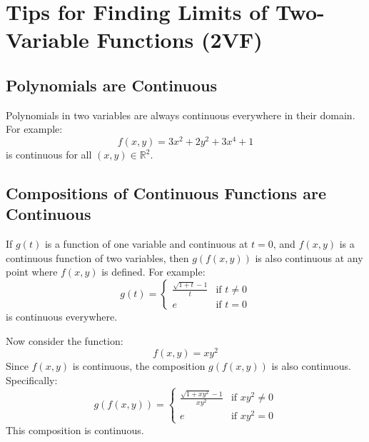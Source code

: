 \documentclass{report}
\begin{document}

\section{Tips for Finding Limits of Two-Variable Functions (2VF)}

\subsection{Polynomials are Continuous}
Polynomials in two variables are always continuous everywhere in their domain. For example:
\[
	f(x, y) = 3x^2 + 2y^2 + 3x^4 + 1
\]
is continuous for all $(x, y) \in \mathbb{R}^2$.

\subsection{Compositions of Continuous Functions are Continuous}
If $g(t)$ is a function of one variable and continuous at $t = 0$, and $f(x, y)$ is a continuous function of two variables, then $g(f(x, y))$ is also continuous at any point where $f(x, y)$ is defined. For example:
\[
	g(t) =
	\begin{cases}
		\frac{\sqrt{1 + t} - 1}{t} & \text{if } t \neq 0 \\
		e                          & \text{if } t = 0
	\end{cases}
\]
is continuous everywhere.

Now consider the function:
\[
	f(x, y) = x y^2
\]
Since $f(x, y)$ is continuous, the composition $g(f(x, y))$ is also continuous. Specifically:
\[
	g(f(x, y)) =
	\begin{cases}
		\frac{\sqrt{1 + x y^2} - 1}{x y^2} & \text{if } x y^2 \neq 0 \\
		e                                  & \text{if } x y^2 = 0
	\end{cases}
\]
This composition is continuous.
\end{document}
